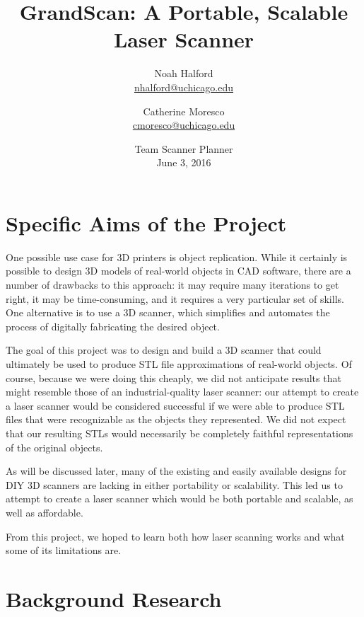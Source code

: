 \documentclass[12pt, letterpaper]{article}
\title{GrandScan: A Portable, Scalable Laser Scanner}
\author{Noah Halford\\
    \href{mailto:nhalford@uchicago.edu}{nhalford@uchicago.edu}
        \and
        Catherine Moresco\\
        \href{mailto:cmoresco@uchicago.edu}{cmoresco@uchicago.edu}}
\date{{\Large Team Scanner Planner}\\[5mm] June 3, 2016}
\begin{document}
\maketitle

\section{Specific Aims of the Project} \label{aims}

One possible use case for 3D printers is object replication. While it certainly is possible
to design 3D models of real-world objects in CAD software, there are a number of drawbacks
to this approach: it may require many iterations to get right, it may be time-consuming, and
it requires a very particular set of skills. One alternative is to use a 3D scanner, which
simplifies and automates the process of digitally fabricating the desired object.

The goal of this project was to design and build a 3D scanner that could ultimately be used
to produce STL file approximations of real-world objects. Of course, because we were doing
this cheaply, we did not anticipate results that might resemble those of an industrial-quality
laser scanner: our attempt to create a laser scanner would be considered successful if we were
able to produce STL files that were recognizable as the objects they represented. We did not
expect that our resulting STLs would necessarily be completely faithful representations of the
original objects.

As will be discussed later, many of the existing and easily available designs for DIY
3D scanners are lacking in either portability or scalability. This led us
to attempt to create a laser scanner which would be both portable and scalable, as well
as affordable.

From this project, we hoped to learn both how laser scanning works and what some of its
limitations are.

\section{Background Research} \label{background}
\end{document}
